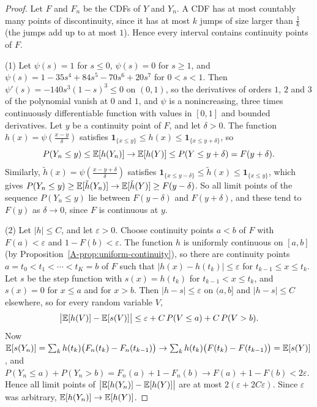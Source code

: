 \begin{proof}
    Let $F$ and $F_n$ be the CDFs of $Y$ and $Y_n$. A CDF has at most countably many points of discontinuity, since it has at most $k$ jumps of size larger than $\frac{1}{k}$ (the jumps add up to at most $1$). Hence every interval contains continuity points of $F$.

    (1) Let $\psi(s) = 1$ for $s \leq 0$, $\psi(s) = 0$ for $s \geq 1$, and $\psi(s) = 1 - 35s^4 + 84s^5 - 70s^6 + 20s^7$ for $0 < s < 1$. Then $\psi'(s) = -140s^3(1 - s)^3 \leq 0$ on $(0, 1)$, so the derivatives of orders $1$, $2$ and $3$ of the polynomial vanish at $0$ and $1$, and $\psi$ is a nonincreasing, three times continuously differentiable function with values in $[0, 1]$ and bounded derivatives. Let $y$ be a continuity point of $F$, and let $\delta > 0$. The function $h(x) = \psi(\frac{x - y}{\delta})$ satisfies $\mathbf{1}_{\{x \leq y\}} \leq h(x) \leq \mathbf{1}_{\{x \leq y + \delta\}}$, so
    \[P(Y_n \leq y) \leq \mathbb{E}[h(Y_n)] \to \mathbb{E}[h(Y)] \leq P(Y \leq y + \delta) = F(y + \delta).\]
    Similarly, $\tilde{h}(x) = \psi(\frac{x - y + \delta}{\delta})$ satisfies $\mathbf{1}_{\{x \leq y - \delta\}} \leq \tilde{h}(x) \leq \mathbf{1}_{\{x \leq y\}}$, which gives $P(Y_n \leq y) \geq \mathbb{E}[\tilde{h}(Y_n)] \to \mathbb{E}[\tilde{h}(Y)] \geq F(y - \delta)$. So all limit points of the sequence $P(Y_n \leq y)$ lie between $F(y - \delta)$ and $F(y + \delta)$, and these tend to $F(y)$ as $\delta \to 0$, since $F$ is continuous at $y$.

    (2) Let $|h| \leq C$, and let $\varepsilon > 0$. Choose continuity points $a < b$ of $F$ with $F(a) < \varepsilon$ and $1 - F(b) < \varepsilon$. The function $h$ is uniformly continuous on $[a, b]$ (by Proposition~\ref{A-prop:uniform-continuity}), so there are continuity points $a = t_0 < t_1 < \cdots < t_K = b$ of $F$ such that $|h(x) - h(t_k)| \leq \varepsilon$ for $t_{k-1} \leq x \leq t_k$. Let $s$ be the step function with $s(x) = h(t_k)$ for $t_{k-1} < x \leq t_k$, and $s(x) = 0$ for $x \leq a$ and for $x > b$. Then $|h - s| \leq \varepsilon$ on $(a, b]$ and $|h - s| \leq C$ elsewhere, so for every random variable $V$,
    \[\big|\mathbb{E}[h(V)] - \mathbb{E}[s(V)]\big| \leq \varepsilon + C\,P(V \leq a) + C\,P(V > b).\]
    Now $\mathbb{E}[s(Y_n)] = \sum_k h(t_k)\big(F_n(t_k) - F_n(t_{k-1})\big) \to \sum_k h(t_k)\big(F(t_k) - F(t_{k-1})\big) = \mathbb{E}[s(Y)]$, and $P(Y_n \leq a) + P(Y_n > b) = F_n(a) + 1 - F_n(b) \to F(a) + 1 - F(b) < 2\varepsilon$. Hence all limit points of $\big|\mathbb{E}[h(Y_n)] - \mathbb{E}[h(Y)]\big|$ are at most $2(\varepsilon + 2C\varepsilon)$. Since $\varepsilon$ was arbitrary, $\mathbb{E}[h(Y_n)] \to \mathbb{E}[h(Y)]$.
\end{proof}

